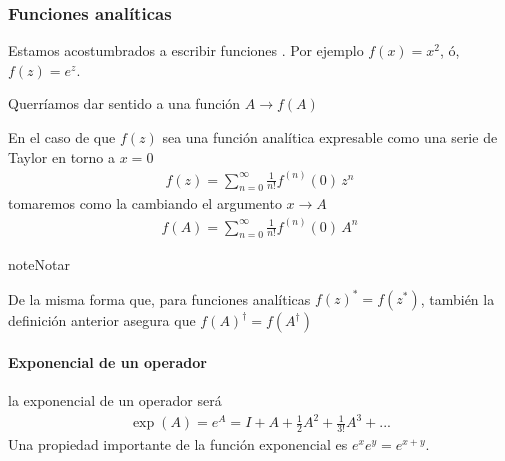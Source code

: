 \documentclass[letterpaper,10pt,english]{jupyterBook}
\begin{document}
\subsubsection{Funciones analíticas}
\label{\detokenize{docs/Part_01_Formalismo/Chapter_01_02_Formalismo_matem_xe1tico/01_03_Operadores_myst:funciones-analiticas}}
\sphinxAtStartPar
Estamos acostumbrados a escribir funciones . Por ejemplo \(f(x)= x^2\), ó, \( f(z) = e^z\).

\sphinxAtStartPar
Querríamos dar sentido a una función 
\(
A \to f(A)
\)

\sphinxAtStartPar
En el caso de que \(f(z)\) sea una función analítica expresable como una serie de Taylor en torno a \(x=0\)
\begin{equation*}
\begin{split}
f(z) = \sum_{n=0}^\infty \frac{1}{n!} f^{(n)}(0)\,  z^n
\end{split}
\end{equation*}
\sphinxAtStartPar
tomaremos como  la  cambiando el argumento \(x\to A\)
\begin{equation*}
\begin{split}
f(A) = \sum_{n=0}^\infty \frac{1}{n!} f^{(n)}(0)\,  A^n
\end{split}
\end{equation*}
\begin{sphinxadmonition}{note}{Notar}

\sphinxAtStartPar
De la misma forma que, para funciones analíticas \(f(z)^* = f(z^*)\), también la definición anterior asegura que
\(f(A)^\dagger = f(A^\dagger)\)
\end{sphinxadmonition}


\paragraph{Exponencial de un operador}
\label{\detokenize{docs/Part_01_Formalismo/Chapter_01_02_Formalismo_matem_xe1tico/01_03_Operadores_myst:exponencial-de-un-operador}}
\sphinxAtStartPar
la exponencial de un operador será
\begin{equation*}
\begin{split}
\exp(A) = e^A = I + A + \frac{1}{2} A^2 + \frac{1}{3!} A^3 + ...
\end{split}
\end{equation*}
\sphinxAtStartPar
Una propiedad importante de la función exponencial es  \(e^xe^y = e^{x+y}\).
\end{document}
